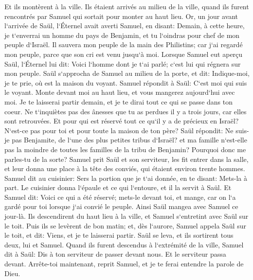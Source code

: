 \verse Et ils montèrent à la ville. Ils étaient arrivés au milieu de la ville, quand ils furent rencontrés par Samuel qui sortait pour monter au haut lieu. 
\verse Or, un jour avant l`arrivée de Saül, l`Éternel avait averti Samuel, en disant: 
\verse Demain, à cette heure, je t`enverrai un homme du pays de Benjamin, et tu l`oindras pour chef de mon peuple d`Israël. Il sauvera mon peuple de la main des Philistins; car j`ai regardé mon peuple, parce que son cri est venu jusqu`à moi. 
\verse Lorsque Samuel eut aperçu Saül, l`Éternel lui dit: Voici l`homme dont je t`ai parlé; c`est lui qui régnera sur mon peuple. 
\verse Saül s`approcha de Samuel au milieu de la porte, et dit: Indique-moi, je te prie, où est la maison du voyant. 
\verse Samuel répondit à Saül: C`est moi qui suis le voyant. Monte devant moi au haut lieu, et vous mangerez aujourd`hui avec moi. Je te laisserai partir demain, et je te dirai tout ce qui se passe dans ton coeur. 
\verse Ne t`inquiètes pas des ânesses que tu as perdues il y a trois jours, car elles sont retrouvées. Et pour qui est réservé tout ce qu`il y a de précieux en Israël? N`est-ce pas pour toi et pour toute la maison de ton père? 
\verse Saül répondit: Ne suis-je pas Benjamite, de l`une des plus petites tribus d`Israël? et ma famille n`est-elle pas la moindre de toutes les familles de la tribu de Benjamin? Pourquoi donc me parles-tu de la sorte? 
\verse Samuel prit Saül et son serviteur, les fit entrer dans la salle, et leur donna une place à la tête des conviés, qui étaient environ trente hommes. 
\verse Samuel dit au cuisinier: Sers la portion que je t`ai donnée, en te disant: Mets-la à part. 
\verse Le cuisinier donna l`épaule et ce qui l`entoure, et il la servit à Saül. Et Samuel dit: Voici ce qui a été réservé; mets-le devant toi, et mange, car on l`a gardé pour toi lorsque j`ai convié le peuple. Ainsi Saül mangea avec Samuel ce jour-là. 
\verse Ils descendirent du haut lieu à la ville, et Samuel s`entretint avec Saül sur le toit. 
\verse Puis ils se levèrent de bon matin; et, dès l`aurore, Samuel appela Saül sur le toit, et dit: Viens, et je te laisserai partir. Saül se leva, et ils sortirent tous deux, lui et Samuel. 
\verse Quand ils furent descendus à l`extrémité de la ville, Samuel dit à Saül: Dis à ton serviteur de passer devant nous. Et le serviteur passa devant. Arrête-toi maintenant, reprit Samuel, et je te ferai entendre la parole de Dieu. 

